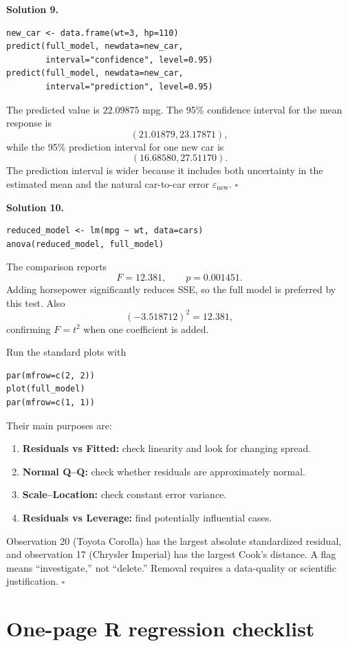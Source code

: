 \documentclass[11pt]{article}
\newenvironment{answer}[1]
 {\par\medskip\noindent\color{green}\textbf{Solution #1.}\color{black}\ }
 {\hfill$\square$\par\medskip}
\begin{document}
\begin{answer}{9}
\begin{lstlisting}
new_car <- data.frame(wt=3, hp=110)
predict(full_model, newdata=new_car,
        interval="confidence", level=0.95)
predict(full_model, newdata=new_car,
        interval="prediction", level=0.95)
\end{lstlisting}
The predicted value is $22.09875$ mpg. The 95\% confidence interval for the
mean response is
\[
 (21.01879,23.17871),
\]
while the 95\% prediction interval for one new car is
\[
 (16.68580,27.51170).
\]
The prediction interval is wider because it includes both uncertainty in the
estimated mean and the natural car-to-car error $\varepsilon_{\mathrm{new}}$.
\end{answer}

\begin{answer}{10}
\begin{lstlisting}
reduced_model <- lm(mpg ~ wt, data=cars)
anova(reduced_model, full_model)
\end{lstlisting}
The comparison reports
\[
 F=12.381,
 \qquad p=0.001451.
\]
Adding horsepower significantly reduces SSE, so the full model is preferred by
this test. Also
\[
 (-3.518712)^2=12.381,
\]
confirming $F=t^2$ when one coefficient is added.

Run the standard plots with
\begin{lstlisting}
par(mfrow=c(2, 2))
plot(full_model)
par(mfrow=c(1, 1))
\end{lstlisting}
Their main purposes are:
\begin{enumerate}[leftmargin=*]
 \item \textbf{Residuals vs Fitted:} check linearity and look for changing
 spread.
 \item \textbf{Normal Q--Q:} check whether residuals are approximately normal.
 \item \textbf{Scale--Location:} check constant error variance.
 \item \textbf{Residuals vs Leverage:} find potentially influential cases.
\end{enumerate}
Observation 20 (Toyota Corolla) has the largest absolute standardized residual,
and observation 17 (Chrysler Imperial) has the largest Cook's distance. A flag
means ``investigate,'' not ``delete.'' Removal requires a data-quality or
scientific justification.
\end{answer}

\newpage
\section*{One-page R regression checklist}
\end{document}
